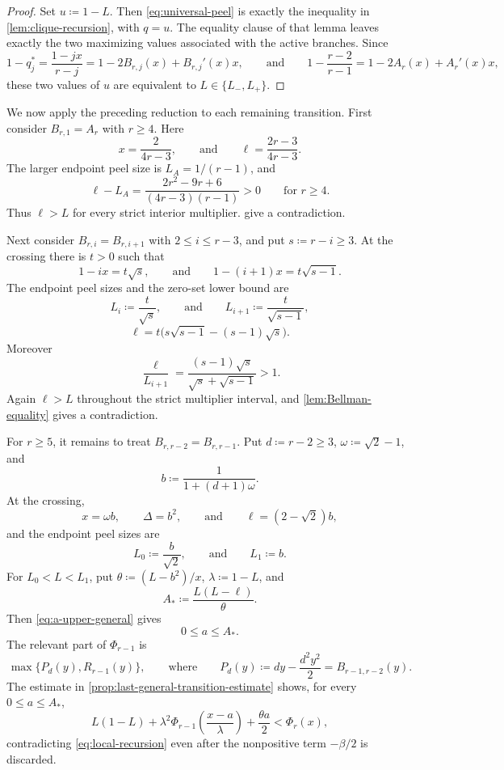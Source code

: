 \documentclass[10pt]{article}
\numberwithin{equation}{section}
\begin{document}
\begin{proof}
Set $u\coloneqq1-L$.  Then \cref{eq:universal-peel} is exactly the inequality in \cref{lem:clique-recursion}, with $q=u$.  The equality clause of that lemma leaves exactly the two maximizing values associated with the active branches.  Since
\[
 1-q_j^*=\frac{1-jx}{r-j}
 =1-2B_{r,j}(x)+B_{r,j}'(x)x,
 \qquad\text{and}\qquad
 1-\frac{r-2}{r-1}
 =1-2A_r(x)+A_r'(x)x,
\]
these two values of $u$ are equivalent to $L\in\{L_-,L_+\}$.
\end{proof}

\label{sec:transition-elimination}
We now apply the preceding reduction to each remaining transition.  First consider $B_{r,1}=A_r$ with $r\ge4$.  Here
\[
 x=\frac2{4r-3},
 \qquad\text{and}\qquad
 \ell=\frac{2r-3}{4r-3}.
\]
The larger endpoint peel size is $L_A=1/(r-1)$, and
\[
 \ell-L_A
 =\frac{2r^2-9r+6}{(4r-3)(r-1)}>0
 \qquad\text{for }r\ge4.
\]
Thus $\ell>L$ for every strict interior multiplier.   give a contradiction.

Next consider $B_{r,i}=B_{r,i+1}$ with $2\le i\le r-3$, and put $s\coloneqq r-i\ge3$.  At the crossing there is $t>0$ such that
\[
 1-ix=t\sqrt{s},
 \qquad\text{and}\qquad
 1-(i+1)x=t\sqrt{s-1}.
\]
The endpoint peel sizes and the zero-set lower bound are
\[
 L_i\coloneqq\frac{t}{\sqrt{s}},
 \qquad\text{and}\qquad
 L_{i+1}\coloneqq\frac{t}{\sqrt{s-1}},
\]
\[
 \ell=t\bigl(s\sqrt{s-1}-(s-1)\sqrt{s}\bigr).
\]
Moreover
\[
 \frac{\ell}{L_{i+1}}
 =\frac{(s-1)\sqrt{s}}{\sqrt{s}+\sqrt{s-1}}>1.
\]
Again $\ell>L$ throughout the strict multiplier interval, and \cref{lem:Bellman-equality} gives a contradiction.

For $r\ge5$, it remains to treat $B_{r,r-2}=B_{r,r-1}$.  Put $d\coloneqq r-2\ge3$, $\omega\coloneqq\sqrt2-1$, and
\[
 b\coloneqq\frac1{1+(d+1)\omega}.
\]
At the crossing,
\[
 x=\omega b,
 \qquad
 \Delta=b^2,
 \qquad\text{and}\qquad
 \ell=(2-\sqrt2)b,
\]
and the endpoint peel sizes are
\[
 L_0\coloneqq\frac b{\sqrt2},
 \qquad\text{and}\qquad
 L_1\coloneqq b.
\]
For $L_0<L<L_1$, put $\theta\coloneqq(L-b^2)/x$, $\lambda\coloneqq1-L$, and
\[
 A_*\coloneqq\frac{L(L-\ell)}{\theta}.
\]
Then \cref{eq:a-upper-general} gives
\[
 0\le a\le A_*.
\]
The relevant part of $\Phi_{r-1}$ is
\[
 \max\{P_d(y),R_{r-1}(y)\},
 \qquad\text{where}\qquad
 P_d(y)\coloneqq dy-\frac{d^2y^2}{2}=B_{r-1,r-2}(y).
\]
The estimate in \cref{prop:last-general-transition-estimate} shows, for every $0\le a\le A_*$,
\[
 L(1-L)+\lambda^2\Phi_{r-1}\left(\frac{x-a}{\lambda}\right)
 +\frac{\theta a}{2}<\Phi_r(x),
\]
contradicting \cref{eq:local-recursion} even after the nonpositive term $-\beta/2$ is discarded.
\end{document}

